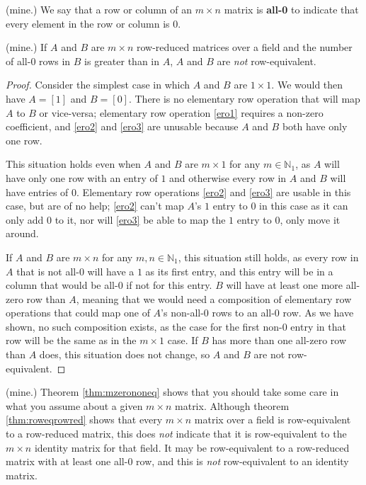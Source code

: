 \documentclass[12pt]{article}
\begin{document}
\begin{defn}
  (mine.) We say that a row or column of an $m \times n$ matrix
  is \textbf{all-0} to indicate that every element in the row or
  column is $0$.
\end{defn}

\begin{thm} \label{thm:mzerononeq}
  (mine.) If $A$ and $B$ are $m \times n$ row-reduced matrices
  over a field and the number of all-0 rows in $B$ is greater
  than in $A$, $A$ and $B$ are \textit{not} row-equivalent.
  \begin{proof}
    Consider the simplest case in which $A$ and $B$ are $1
    \times 1$. We would then have $A = [1]$ and $B = [0]$. There
    is no elementary row operation that will map $A$ to $B$ or
    vice-versa; elementary row operation \eqref{ero1} requires a
    non-zero coefficient, and \eqref{ero2} and \eqref{ero3} are
    unusable because $A$ and $B$ both have only one row.

    This situation holds even when $A$ and $B$ are $m \times 1$
    for any $m \in \mathbb{N}_1$, as $A$ will have only one row
    with an entry of $1$ and otherwise every row in $A$ and $B$
    will have entries of $0$. Elementary row operations
    \eqref{ero2} and \eqref{ero3} are usable in this case, but
    are of no help; \eqref{ero2} can't map $A$'s $1$ entry to $0$
    in this case as it can only add $0$ to it, nor will
    \eqref{ero3} be able to map the $1$ entry to $0$, only move
    it around.

    If $A$ and $B$ are $m \times n$ for any $m,n \in
    \mathbb{N}_1$, this situation still holds, as every row in
    $A$ that is not all-0 will have a $1$ as its first entry, and
    this entry will be in a column that would be all-0 if not for
    this entry. $B$ will have at least one more all-zero row than
    $A$, meaning that we would need a composition of elementary
    row operations that could map one of $A$'s non-all-0 rows to
    an all-0 row. As we have shown, no such composition exists,
    as the case for the first non-0 entry in that row will be the
    same as in the $m \times 1$ case. If $B$ has more than one
    all-zero row than $A$ does, this situation does not change,
    so $A$ and $B$ are not row-equivalent.
  \end{proof}
\end{thm}

\begin{comm}
  (mine.) Theorem \ref{thm:mzerononeq} shows that you should take
  some care in what you assume about a given $m \times n$ matrix.
  Although theorem \ref{thm:roweqrowred} shows that every $m
  \times n$ matrix over a field is row-equivalent to a
  row-reduced matrix, this does \textit{not} indicate that it is
  row-equivalent to the $m \times n$ identity matrix for that
  field. It may be row-equivalent to a row-reduced matrix with at
  least one all-0 row, and this is \textit{not} row-equivalent to
  an identity matrix.
\end{comm}
\end{document}
